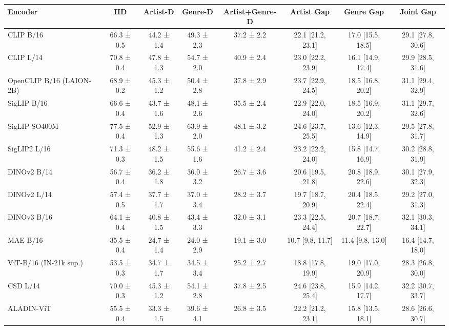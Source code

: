 \begin{tabular}{lccccccc}
\toprule
Encoder & IID & Artist-D & Genre-D & Artist+Genre-D & Artist Gap & Genre Gap & Joint Gap \\
\midrule
CLIP B/16 & 66.3 ± 0.5 & 44.2 ± 1.4 & 49.3 ± 2.3 & 37.2 ± 2.2 & 22.1 [21.2, 23.1] & 17.0 [15.5, 18.5] & 29.1 [27.8, 30.6] \\
CLIP L/14 & 70.8 ± 0.4 & 47.8 ± 1.3 & 54.7 ± 2.0 & 40.9 ± 2.4 & 23.0 [22.2, 23.9] & 16.1 [14.9, 17.4] & 29.9 [28.5, 31.6] \\
OpenCLIP B/16 (LAION-2B) & 68.9 ± 0.2 & 45.3 ± 1.2 & 50.4 ± 2.8 & 37.8 ± 2.9 & 23.7 [22.9, 24.5] & 18.5 [16.8, 20.2] & 31.1 [29.4, 32.9] \\
SigLIP B/16 & 66.6 ± 0.4 & 43.7 ± 1.6 & 48.1 ± 2.6 & 35.5 ± 2.4 & 22.9 [22.0, 24.0] & 18.5 [16.9, 20.2] & 31.1 [29.7, 32.6] \\
SigLIP SO400M & 77.5 ± 0.4 & 52.9 ± 1.3 & 63.9 ± 2.0 & 48.1 ± 3.2 & 24.6 [23.7, 25.5] & 13.6 [12.3, 14.9] & 29.5 [27.8, 31.7] \\
SigLIP2 L/16 & 71.3 ± 0.3 & 48.2 ± 1.5 & 55.6 ± 1.6 & 41.2 ± 2.4 & 23.2 [22.2, 24.0] & 15.8 [14.7, 16.9] & 30.2 [28.8, 31.9] \\
DINOv2 B/14 & 56.7 ± 0.4 & 36.2 ± 1.8 & 36.0 ± 3.2 & 26.7 ± 3.6 & 20.6 [19.5, 21.8] & 20.8 [18.9, 22.6] & 30.1 [27.9, 32.3] \\
DINOv2 L/14 & 57.4 ± 0.5 & 37.7 ± 1.7 & 37.0 ± 3.4 & 28.2 ± 3.7 & 19.7 [18.7, 20.9] & 20.4 [18.5, 22.4] & 29.2 [27.0, 31.3] \\
DINOv3 B/16 & 64.1 ± 0.4 & 40.8 ± 1.5 & 43.4 ± 3.3 & 32.0 ± 3.1 & 23.3 [22.5, 24.4] & 20.7 [18.7, 22.7] & 32.1 [30.3, 34.1] \\
MAE B/16 & 35.5 ± 0.4 & 24.7 ± 1.4 & 24.0 ± 2.9 & 19.1 ± 3.0 & 10.7 [9.8, 11.7] & 11.4 [9.8, 13.0] & 16.4 [14.7, 18.0] \\
ViT-B/16 (IN-21k sup.) & 53.5 ± 0.3 & 34.7 ± 1.7 & 34.5 ± 3.4 & 25.2 ± 2.7 & 18.8 [17.8, 19.9] & 19.0 [17.0, 20.9] & 28.3 [26.8, 30.0] \\
CSD L/14 & 70.0 ± 0.3 & 45.3 ± 1.2 & 54.1 ± 2.8 & 37.8 ± 2.5 & 24.6 [23.8, 25.4] & 15.9 [14.2, 17.7] & 32.2 [30.7, 33.7] \\
ALADIN-ViT & 55.5 ± 0.4 & 33.3 ± 1.5 & 39.6 ± 4.1 & 26.8 ± 3.5 & 22.2 [21.2, 23.1] & 15.8 [13.5, 18.1] & 28.6 [26.6, 30.7] \\
\bottomrule
\end{tabular}
